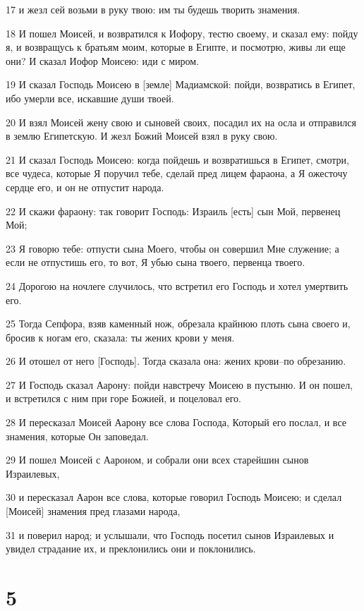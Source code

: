 \par 17 и жезл сей возьми в руку твою: им ты будешь творить знамения.
\par 18 И пошел Моисей, и возвратился к Иофору, тестю своему, и сказал ему: пойду я, и возвращусь к братьям моим, которые в Египте, и посмотрю, живы ли еще они? И сказал Иофор Моисею: иди с миром.
\par 19 И сказал Господь Моисею в [земле] Мадиамской: пойди, возвратись в Египет, ибо умерли все, искавшие души твоей.
\par 20 И взял Моисей жену свою и сыновей своих, посадил их на осла и отправился в землю Египетскую. И жезл Божий Моисей взял в руку свою.
\par 21 И сказал Господь Моисею: когда пойдешь и возвратишься в Египет, смотри, все чудеса, которые Я поручил тебе, сделай пред лицем фараона, а Я ожесточу сердце его, и он не отпустит народа.
\par 22 И скажи фараону: так говорит Господь: Израиль [есть] сын Мой, первенец Мой;
\par 23 Я говорю тебе: отпусти сына Моего, чтобы он совершил Мне служение; а если не отпустишь его, то вот, Я убью сына твоего, первенца твоего.
\par 24 Дорогою на ночлеге случилось, что встретил его Господь и хотел умертвить его.
\par 25 Тогда Сепфора, взяв каменный нож, обрезала крайнюю плоть сына своего и, бросив к ногам его, сказала: ты жених крови у меня.
\par 26 И отошел от него [Господь]. Тогда сказала она: жених крови--по обрезанию.
\par 27 И Господь сказал Аарону: пойди навстречу Моисею в пустыню. И он пошел, и встретился с ним при горе Божией, и поцеловал его.
\par 28 И пересказал Моисей Аарону все слова Господа, Который его послал, и все знамения, которые Он заповедал.
\par 29 И пошел Моисей с Аароном, и собрали они всех старейшин сынов Израилевых,
\par 30 и пересказал Аарон все слова, которые говорил Господь Моисею; и сделал [Моисей] знамения пред глазами народа,
\par 31 и поверил народ; и услышали, что Господь посетил сынов Израилевых и увидел страдание их, и преклонились они и поклонились.

\chapter{5}

